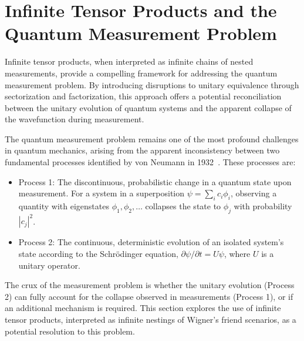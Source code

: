 \documentclass[shortAfour,sageh,times]{sagej}
\begin{document}

\section{Infinite Tensor Products and the Quantum Measurement Problem}

Infinite tensor products, when interpreted as infinite chains of nested measurements, provide a compelling framework for addressing the quantum measurement problem.
By introducing disruptions to unitary equivalence through sectorization and factorization, this approach offers a potential reconciliation between the unitary evolution of quantum systems and the apparent collapse of the wavefunction during measurement.


The quantum measurement problem remains one of the most profound challenges in quantum mechanics, arising from the apparent inconsistency between two fundamental processes identified by von Neumann in 1932~\citep{v-neumann-49,vonNeumann2018Feb,everett}. These processes are:
{
\setlength{\leftmargini}{15pt}
\begin{itemize}
    \item[] Process 1: The discontinuous, probabilistic change in a quantum state upon measurement. For a system in a superposition $\psi = \sum_{i} c_i \phi_i$, observing a quantity with eigenstates $\phi_1, \phi_2, \dots$ collapses the state to $\phi_j$ with probability $|c_j|^2$.
    \item[] Process 2: The continuous, deterministic evolution of an isolated system's state according to the Schr\"odinger equation, $\partial \psi / \partial t = U \psi$, where $U$ is a unitary operator.
\end{itemize}
}

The crux of the measurement problem is whether the unitary evolution (Process 2) can fully account for the collapse observed in measurements (Process 1), or if an additional mechanism is required. This section explores the use of infinite tensor products, interpreted as infinite nestings of Wigner's friend scenarios, as a potential resolution to this problem.
\end{document}
